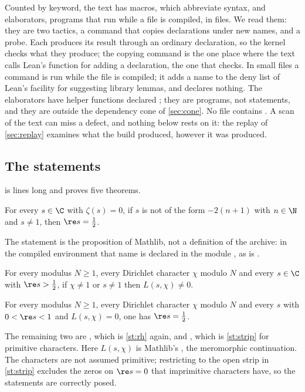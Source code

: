 Counted by keyword, the text has \scanmacros{} macros, which abbreviate syntax, and
\scanelabs{} elaborators, programs that run while a file is compiled, in \scanelabfiles{}
files. We read them: they are two tactics, a command that copies declarations under new
names, and a probe. Each produces its result through an ordinary declaration, so the kernel
checks what they produce; the copying command is the one place where the text calls Lean's
function for adding a declaration, the one that checks. In \scanruncmdfiles{} small files a
command is run while the file is compiled; it adds a name to the deny list of Lean's facility
for suggesting library lemmas, and declares nothing. The elaborators have
\scanpartial{} helper functions declared ; they are programs, not statements,
and they are outside the dependency cone of \cref{sec:cone}. No file contains .
A scan of the text can miss a defect, and nothing below rests on it: the replay of
\cref{sec:replay} examines what the build produced, however it was produced.

\subsection{The statements}\label{sec:statements}
 is \mainlines{} lines long and proves five theorems.
\begin{statement}\label{st:rh}
For every $s\in\C$ with $\zeta(s)=0$, if $s$ is not of the form $-2(n+1)$ with $n\in\N$ and
$s\neq 1$, then $\re s=\tfrac12$.
\end{statement}
The statement is the proposition  of Mathlib, not a definition of the
archive: in the compiled environment that name is declared in the module
, as is .
\begin{statement}\label{st:grh}
For every modulus $N\ge 1$, every Dirichlet character $\chi$ modulo $N$ and every $s\in\C$ with
$\re s>\tfrac12$, if $\chi\neq 1$ or $s\neq1$ then $L(s,\chi)\neq0$.
\end{statement}
\begin{statement}\label{st:strip}
For every modulus $N\ge1$, every Dirichlet character $\chi$ modulo $N$ and every $s$ with
$0<\re s<1$ and $L(s,\chi)=0$, one has $\re s=\tfrac12$.
\end{statement}
The remaining two are , which is \cref{st:rh} again, and
, which is \cref{st:strip} for primitive characters.
Here $L(s,\chi)$ is Mathlib's , the meromorphic continuation.
The characters are not assumed primitive; restricting to the open strip in \cref{st:strip}
excludes the zeros on $\re s=0$ that imprimitive characters have, so the statements are
correctly posed.

